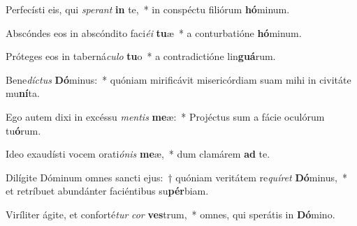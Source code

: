 \item Perfecísti eis, qui \textit{spe}\textit{rant} \textbf{in} te,~* in conspéctu filiórum \textbf{hó}minum.
\item Abscóndes eos in abscóndito faci\textit{é}\textit{i} \textbf{tu}æ~* a conturbatióne \textbf{hó}minum.
\item Próteges eos in taberná\textit{cu}\textit{lo} \textbf{tu}o~* a contradictióne lin\textbf{guá}rum.
\item Bene\textit{díc}\textit{tus} \textbf{Dó}minus:~* quóniam mirificávit misericórdiam suam mihi in civitáte mu\textbf{ní}ta.
\item Ego autem dixi in excéssu \textit{men}\textit{tis} \textbf{me}æ:~* Projéctus sum a fácie oculórum tu\textbf{ó}rum.
\item Ideo exaudísti vocem orati\textit{ó}\textit{nis} \textbf{me}æ,~* dum clamárem \textbf{ad} te.
\item Dilígite Dóminum omnes sancti ejus:~† quóniam veritátem re\textit{quí}\textit{ret} \textbf{Dó}minus,~* et retríbuet abundánter faciéntibus su\textbf{pér}biam.
\item Viríliter ágite, et conforté\textit{tur} \textit{cor} \textbf{ves}trum,~* omnes, qui sperátis in \textbf{Dó}mino.
